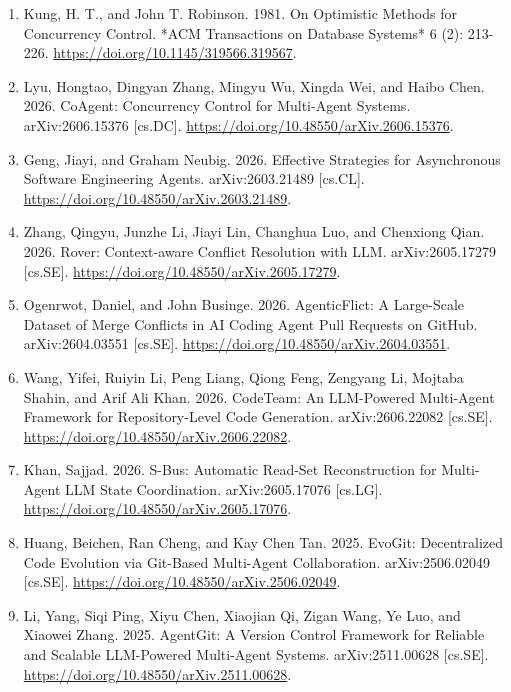 \documentclass[9pt,letterpaper]{extarticle}
\begin{document}
\begin{enumerate}
\item \label{ref:10} Kung, H. T., and John T. Robinson. 1981. {}On Optimistic Methods for Concurrency Control.{} *ACM Transactions on Database Systems* 6 (2): 213-226. \url{https://doi.org/10.1145/319566.319567}.
\item \label{ref:11} Lyu, Hongtao, Dingyan Zhang, Mingyu Wu, Xingda Wei, and Haibo Chen. 2026. {}CoAgent: Concurrency Control for Multi-Agent Systems.{} arXiv:2606.15376 [cs.DC]. \url{https://doi.org/10.48550/arXiv.2606.15376}.
\item \label{ref:12} Geng, Jiayi, and Graham Neubig. 2026. {}Effective Strategies for Asynchronous Software Engineering Agents.{} arXiv:2603.21489 [cs.CL]. \url{https://doi.org/10.48550/arXiv.2603.21489}.
\item \label{ref:13} Zhang, Qingyu, Junzhe Li, Jiayi Lin, Changhua Luo, and Chenxiong Qian. 2026. {}Rover: Context-aware Conflict Resolution with LLM.{} arXiv:2605.17279 [cs.SE]. \url{https://doi.org/10.48550/arXiv.2605.17279}.
\item \label{ref:14} Ogenrwot, Daniel, and John Businge. 2026. {}AgenticFlict: A Large-Scale Dataset of Merge Conflicts in AI Coding Agent Pull Requests on GitHub.{} arXiv:2604.03551 [cs.SE]. \url{https://doi.org/10.48550/arXiv.2604.03551}.
\item \label{ref:15} Wang, Yifei, Ruiyin Li, Peng Liang, Qiong Feng, Zengyang Li, Mojtaba Shahin, and Arif Ali Khan. 2026. {}CodeTeam: An LLM-Powered Multi-Agent Framework for Repository-Level Code Generation.{} arXiv:2606.22082 [cs.SE]. \url{https://doi.org/10.48550/arXiv.2606.22082}.
\item \label{ref:16} Khan, Sajjad. 2026. {}S-Bus: Automatic Read-Set Reconstruction for Multi-Agent LLM State Coordination.{} arXiv:2605.17076 [cs.LG]. \url{https://doi.org/10.48550/arXiv.2605.17076}.
\item \label{ref:17} Huang, Beichen, Ran Cheng, and Kay Chen Tan. 2025. {}EvoGit: Decentralized Code Evolution via Git-Based Multi-Agent Collaboration.{} arXiv:2506.02049 [cs.SE]. \url{https://doi.org/10.48550/arXiv.2506.02049}.
\item \label{ref:18} Li, Yang, Siqi Ping, Xiyu Chen, Xiaojian Qi, Zigan Wang, Ye Luo, and Xiaowei Zhang. 2025. {}AgentGit: A Version Control Framework for Reliable and Scalable LLM-Powered Multi-Agent Systems.{} arXiv:2511.00628 [cs.SE]. \url{https://doi.org/10.48550/arXiv.2511.00628}.

\end{enumerate}
\end{document}
